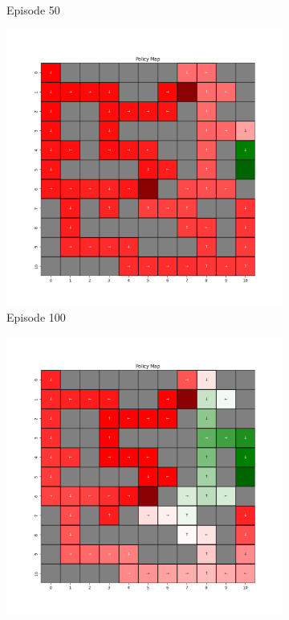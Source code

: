 \documentclass{assignment}
\begin{document}
\begin{figure}[H]
\begin{subfigure}{0.3\textwidth}
    \caption{Episode 50}
    \end{subfigure}\hfill
    \begin{subfigure}{0.3\textwidth}
        \includegraphics[width=\textwidth]{figures/policy_q/epsilon_sweep/policy_alpha_0.1_gamma_0.95_epsilon_0.5_iteration_100.png}
    \caption{Episode 100}
    \end{subfigure}
    \begin{subfigure}{0.3\textwidth}
        \includegraphics[width=\textwidth]{figures/policy_q/epsilon_sweep/policy_alpha_0.1_gamma_0.95_epsilon_0.5_iteration_1000.png}

\end{subfigure}
\end{figure}
\end{document}
